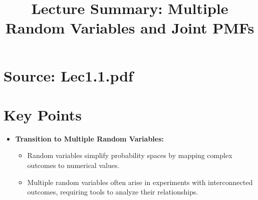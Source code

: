 \documentclass{article}
\title{Lecture Summary: Multiple Random Variables and Joint PMFs}
\author{}
\date{}
\begin{document}
\maketitle

\section*{Source: Lec1.1.pdf}

\section*{Key Points}

\begin{itemize}
  \item \textbf{Transition to Multiple Random Variables:}
    \begin{itemize}
      \item Random variables simplify probability spaces by mapping complex outcomes to numerical values.
      \item Multiple random variables often arise in experiments with interconnected outcomes, requiring tools to analyze their relationships.
    \end{itemize}


\end{itemize}
\end{document}
